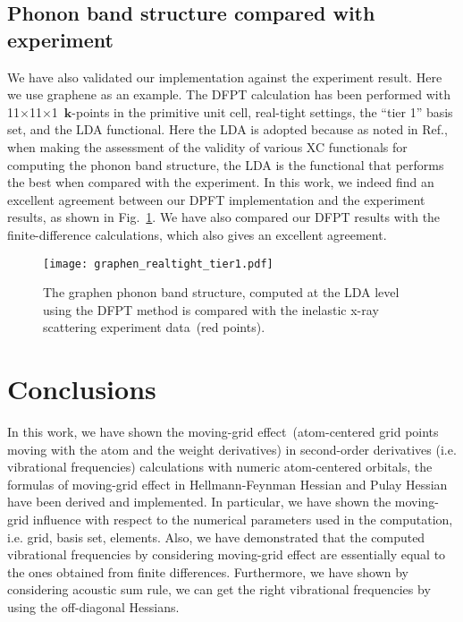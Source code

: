\documentclass[journal=jpca,manuscript=article]{achemso}
\begin{document}
\subsection{Phonon band structure compared with experiment}
\label{subsec:phonon}
We have also validated our implementation against the experiment result. Here we use graphene as an example. The DFPT calculation has been performed with 11$\times$11$\times$1~$\mathbf{k}$-points in the primitive unit cell, real-tight settings, the ``tier 1'' basis set, and the LDA functional. 
Here the LDA is adopted because as noted in Ref.\cite{He2014}, when making the assessment of the validity of various XC functionals for computing the phonon band structure, the LDA is the functional that performs the best when compared with the experiment. In this work, we indeed find an excellent agreement between our DPFT implementation and the experiment results\cite{Maultzsch2004}, as shown in Fig.~\ref{fig:graphen}. We have also compared our DFPT results with the finite-difference calculations, which also gives an excellent agreement\cite{Shang2017}.

\begin{figure}
 \texttt{[image: graphen\_realtight\_tier1.pdf]}
 \caption{The graphen phonon band structure, computed at the LDA level using the DFPT method is compared with the inelastic x-ray scattering experiment data~(red points)\cite{Maultzsch2004}. }
 \label{fig:graphen}
\end{figure}







\section{Conclusions} 
\label{sec:conclusions}
In this work, we have shown the moving-grid effect~(atom-centered grid points moving with the atom and the weight derivatives) in second-order derivatives (i.e. vibrational frequencies) calculations with numeric atom-centered orbitals, the formulas of
moving-grid effect in Hellmann-Feynman Hessian and Pulay Hessian have been derived and implemented. In particular, we have
shown the moving-grid influence with respect to the numerical parameters used in the computation, i.e. grid, basis set, elements. 
Also, we have demonstrated that the computed vibrational frequencies by considering moving-grid effect are essentially equal to the ones obtained from finite differences. Furthermore, we have shown by considering 
acoustic sum rule, we can get the right vibrational frequencies by using the off-diagonal Hessians. 
\end{document}

